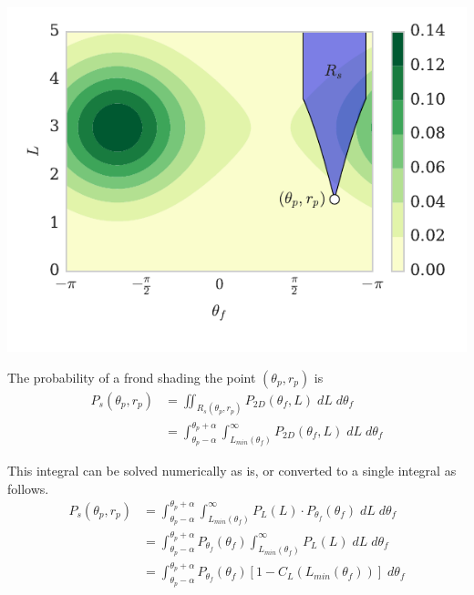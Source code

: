 \documentclass[10pt]{article}
\newenvironment{mcfig}
	{\par\medskip\noindent\minipage{\linewidth}}
	{\endminipage\par\medskip}
\begin{document}
\begin{multicols}{2}
\begin{mcfig}
	\centering
	\includegraphics[width=\linewidth]{cart_shade}
	\vspace{-3em}
	\label{fig:cart_shade}
\end{mcfig}

The probability of a frond shading the point $(\theta_p,r_p)$ is
\begin{align}
		P_s(\theta_p,r_p)	&= \iint_{R_s(\theta_p,r_p)}
								P_{2D}(\theta_f,L)
								\;dL\;d\theta_f \nonumber \\
							&= \int_{\theta_p-\alpha}^{\theta_p+\alpha} 
								\int_{L_{min}(\theta_f)}^\infty
								P_{2D}(\theta_f,L)
								\;dL\;d\theta_f
\end{align}

This integral can be solved numerically as is, or converted to a single integral as follows.
\begin{align}
	P_s(\theta_p,r_p)	&= \int_{\theta_p-\alpha}^{\theta_p+\alpha} 
							\int_{L_{min}(\theta_f)}^\infty
							P_L(L) \cdot P_{\theta_f}(\theta_f)
							\;dL\;d\theta_f \nonumber \\
						&= \int_{\theta_p-\alpha}^{\theta_p+\alpha} 
							P_{\theta_f}(\theta_f)
							\int_{L_{min}(\theta_f)}^\infty
							P_L(L)
							\;dL\;d\theta_f \nonumber \\
						&= \int_{\theta_p-\alpha}^{\theta_p+\alpha} 
							P_{\theta_f}(\theta_f)
							\left[ 1-C_L(L_{min}(\theta_f)) \right]
							\;d\theta_f 
\end{align}


\end{multicols}
\end{document}
